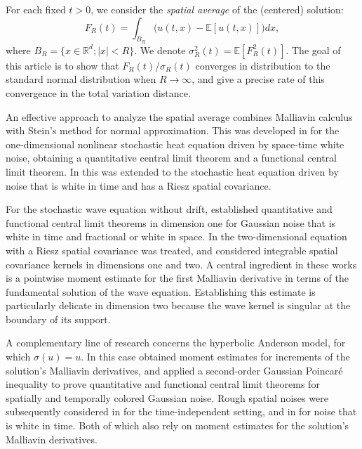 \documentclass[12pt]{article}
\def\bE{\mathbb{E}}
\def\bR{\mathbb{R}}
\begin{document}
For each fixed $t>0$, we consider the {\em spatial average} of the (centered) solution:
\[
F_R(t)=\int_{B_R} \big(u(t,x)-\bE[u(t,x)] \big)dx,
\]
where $B_R=\{x \in \bR^d;|x|<R\}$. We denote $\sigma_R^2(t)=\bE[F_R^2(t)]$. The goal of this article is to show that $F_R(t)/\sigma_R(t)$ converges in distribution to the standard normal distribution when $R \to \infty$, and give a precise rate of this convergence in the total variation distance. 

An effective approach to analyze the spatial average combines Malliavin calculus with Stein's method for normal approximation. This was developed in \cite{HNV20} for the one-dimensional nonlinear stochastic heat equation driven by space-time white noise, obtaining a quantitative central limit theorem and a functional central limit theorem. In \cite{HNVZ20} this was extended to the stochastic heat equation driven by noise that is white in time and has a Riesz spatial covariance. 

For the stochastic wave equation without drift, \cite{DNZ20} established quantitative and functional central limit theorems in dimension one for Gaussian noise that is white in time and fractional or white in space. In \cite{BNZ} the two-dimensional equation with a Riesz spatial covariance was treated, and \cite{NZ22} considered integrable spatial covariance kernels in dimensions one and two. A central ingredient in these works is a pointwise moment estimate for the first Malliavin derivative in terms of the fundamental solution of the wave equation. Establishing this estimate is particularly delicate in dimension two because the wave kernel is singular at the boundary of its support.

A complementary line of research concerns the hyperbolic Anderson model, for which $\sigma(u)=u$. In this case \cite{BNQZ} obtained moment estimates for increments of the solution's Malliavin derivatives, and applied a second-order Gaussian Poincar\'e inequality to prove quantitative and functional central limit theorems for spatially and temporally colored Gaussian noise. Rough spatial noises were subsequently considered in \cite{BY24} for the time-independent setting, and in \cite{BHWXY25} for noise that is white in time. Both of which also rely on moment estimates for the solution's Malliavin derivatives.
\end{document}
